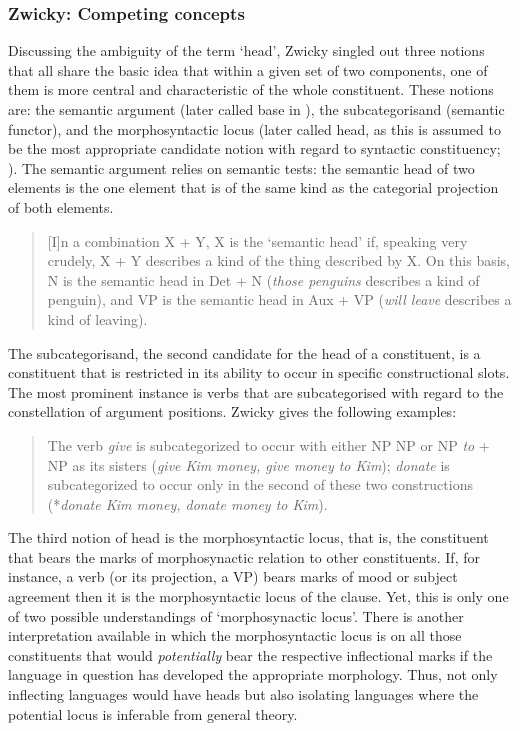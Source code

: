 \subsubsection{Zwicky: Competing concepts}\label{sec:Zwicky}

Discussing the ambiguity of the term `head', Zwicky singled out three notions that all share the basic idea that within a given set of two components, one of them is more central and characteristic of the whole constituent. These notions are: the semantic argument (later called base in \citealt{zwicky199313}), the subcategorisand (semantic functor), and the morphosyntactic locus (later called head, as this is assumed to be the most appropriate candidate notion with regard to syntactic constituency; \citealt[3]{zwicky1985heads1}). The semantic argument relies on semantic tests: the semantic head of two elements is the one element that is of the same kind as the categorial projection of both elements.

\begin{quote}
[I]n a combination X + Y, X is the `semantic head' if, speaking very crudely, X + Y describes a kind of the thing described by X. On this basis, N is the semantic head in Det + N (\textit{those penguins} describes a kind of penguin), and VP is the semantic head in Aux + VP (\textit{will leave} describes a kind of leaving). \citep[4]{zwicky1985heads1}
\end{quote}

The subcategorisand, the second candidate for the head of a constituent, is a constituent that is restricted in its ability to occur in specific constructional slots. The most prominent instance is verbs that are subcategorised with regard to the constellation of argument positions. Zwicky gives the following examples:

\begin{quote}
The verb \textit{give} is subcategorized to occur with either NP NP or NP \textit{to} + NP as its sisters (\textit{give Kim money, give money to Kim}); \textit{donate} is subcategorized to occur only in the second of these two constructions (*\textit{donate Kim money, donate money to Kim}). \citep[5]{zwicky1985heads1}
\end{quote}

The third notion of head is the morphosyntactic locus, that is, the constituent that bears the marks of morphosynactic relation to other constituents. If, for instance, a verb (or its projection, a VP) bears marks of mood or subject agreement then it is the morphosyntactic locus of the clause. Yet, this is only one of two possible understandings of `morphosynactic locus'. There is another interpretation available in which the morphosyntactic locus is on all those constituents that would \emph{potentially} bear the respective inflectional marks if the language in question has developed the appropriate morphology. Thus, not only inflecting languages would have heads but also isolating languages where the potential locus is inferable from general theory.

